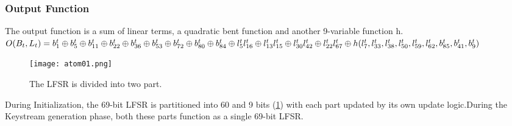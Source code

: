 \subsubsection*{Output Function}
The output function
is a sum of linear terms, a quadratic
bent function and another 9-variable
function h.
\\[2mm]
$\label{eq:3}
O(B_t,L_t) = b^t_{1} \oplus  b^t_{5} \oplus  b^t_{11} \oplus  b^t_{22} \oplus  b^t_{36} \oplus  b^t_{53} \oplus  b^t_{72} \oplus  b^t_{80} \oplus  b^t_{84}\\ \oplus  l^t_{5}l^t_{16} \oplus  l^t_{13}l^t_{15} \oplus  l^t_{30}l^t_{42} \oplus  l^t_{22}l^t_{67} \oplus  h(l^t_{7},l^t_{33},l^t_{38},l^t_{50},l^t_{59},l^t_{62},b^t_{85},b^t_{41},b^t_{9})
$
\\[2mm]
\begin{figure}[h]
	\centering

	\texttt{[image: atom01.png]}
	\caption{The LFSR is divided into two part.}
		\label{fig:atom01}
\end{figure}
During Initialization, the 69-bit LFSR is
partitioned into 60 and 9 bits (\ref{fig:atom01}) with each
part updated by its own update logic.During the Keystream generation
phase, both these parts function as a
single 69-bit LFSR.

